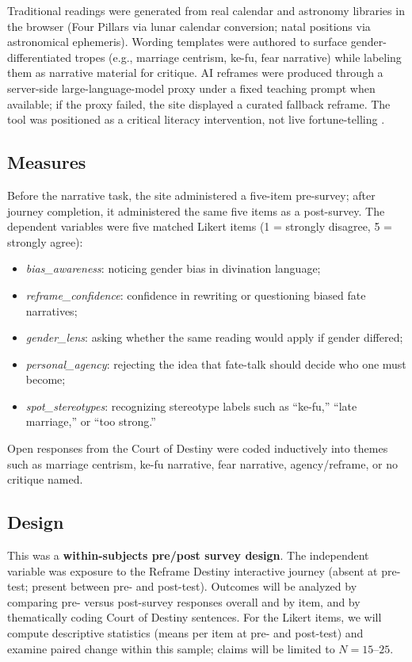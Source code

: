\documentclass[stu,12pt,floatsintext]{apa7}
\begin{document}
Traditional readings were generated from real calendar and astronomy libraries in the browser (Four Pillars via lunar calendar conversion; natal positions via astronomical ephemeris). Wording templates were authored to surface gender-differentiated tropes (e.g., marriage centrism, ke-fu, fear narrative) while labeling them as narrative material for critique. AI reframes were produced through a server-side large-language-model proxy under a fixed teaching prompt when available; if the proxy failed, the site displayed a curated fallback reframe. The tool was positioned as a critical literacy intervention, not live fortune-telling \parencite{bender2021}.

\subsection{Measures}

Before the narrative task, the site administered a five-item pre-survey; after journey completion, it administered the same five items as a post-survey. The dependent variables were five matched Likert items (1 = strongly disagree, 5 = strongly agree):

\begin{itemize}
  \item \textit{bias\_awareness}: noticing gender bias in divination language;
  \item \textit{reframe\_confidence}: confidence in rewriting or questioning biased fate narratives;
  \item \textit{gender\_lens}: asking whether the same reading would apply if gender differed;
  \item \textit{personal\_agency}: rejecting the idea that fate-talk should decide who one must become;
  \item \textit{spot\_stereotypes}: recognizing stereotype labels such as ``ke-fu,'' ``late marriage,'' or ``too strong.''
\end{itemize}

Open responses from the Court of Destiny were coded inductively into themes such as marriage centrism, ke-fu narrative, fear narrative, agency/reframe, or no critique named.

\subsection{Design}

This was a \textbf{within-subjects pre/post survey design}. The independent variable was exposure to the Reframe Destiny interactive journey (absent at pre-test; present between pre- and post-test). Outcomes will be analyzed by comparing pre- versus post-survey responses overall and by item, and by thematically coding Court of Destiny sentences. For the Likert items, we will compute descriptive statistics (means per item at pre- and post-test) and examine paired change within this sample; claims will be limited to $N = 15$--$25$.
\end{document}
